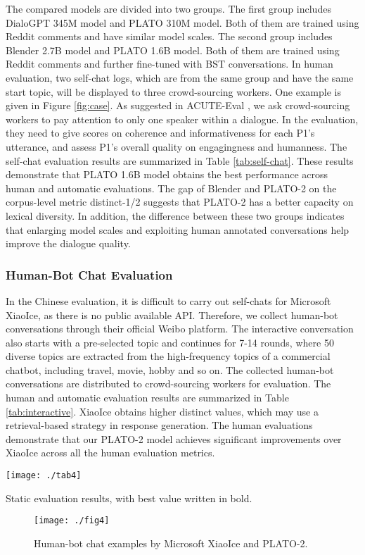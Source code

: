 \documentclass[11pt,a4paper]{article}
\begin{document}
	The compared models are divided into two groups. The first group includes DialoGPT 345M model and PLATO 310M model. Both of them are trained using Reddit comments and have similar model scales. The second group includes Blender 2.7B model and PLATO 1.6B model. Both of them are trained using Reddit comments and further fine-tuned with BST conversations. In human evaluation, two self-chat logs, which are from the same group and have the same start topic, will be displayed to three crowd-sourcing workers. One example is given in Figure \ref{fig:case}. As suggested in ACUTE-Eval \cite{li2019acute}, we ask crowd-sourcing workers to pay attention to only one speaker within a dialogue. In the evaluation, they need to give scores on coherence and informativeness for each P1's utterance, and assess P1's overall quality on engagingness and humanness. The self-chat evaluation results are summarized in Table \ref{tab:self-chat}. These results demonstrate that PLATO 1.6B model obtains the best performance across human and automatic evaluations. The gap of Blender and PLATO-2 on the corpus-level metric distinct-1/2 suggests that PLATO-2 has a better capacity on lexical diversity. In addition, the difference between these two groups indicates that enlarging model scales and 
	exploiting human annotated conversations help improve the dialogue quality.
	
	\subsubsection{Human-Bot Chat Evaluation}
	In the Chinese evaluation, it is difficult to carry out self-chats for Microsoft XiaoIce, as there is no public available API. Therefore, we collect human-bot conversations through their official Weibo platform. The interactive conversation also starts with a pre-selected topic and continues for 7-14 rounds, where 50 diverse topics are extracted from the high-frequency topics of a commercial chatbot, including travel, movie, hobby and so on. The collected human-bot conversations are distributed to crowd-sourcing workers for evaluation. The human and automatic evaluation results are summarized in Table \ref{tab:interactive}. XiaoIce obtains higher distinct values, 
	which may use a retrieval-based strategy in response generation. The human evaluations demonstrate that our PLATO-2 model achieves significant improvements over XiaoIce across all the 
	human evaluation metrics. 
	
	\begin{table}
		\centering
		\texttt{[image: ./tab4]}
		\caption{Static evaluation results, with best value written in bold.}
		\label{tab:static_1}
	\end{table}
	\begin{figure*}[!htb]
		\centering
		\texttt{[image: ./fig4]}
		\caption{Human-bot chat examples by Microsoft XiaoIce and PLATO-2.}
		\label{fig:case_zh}
	\end{figure*} 
\end{document}
